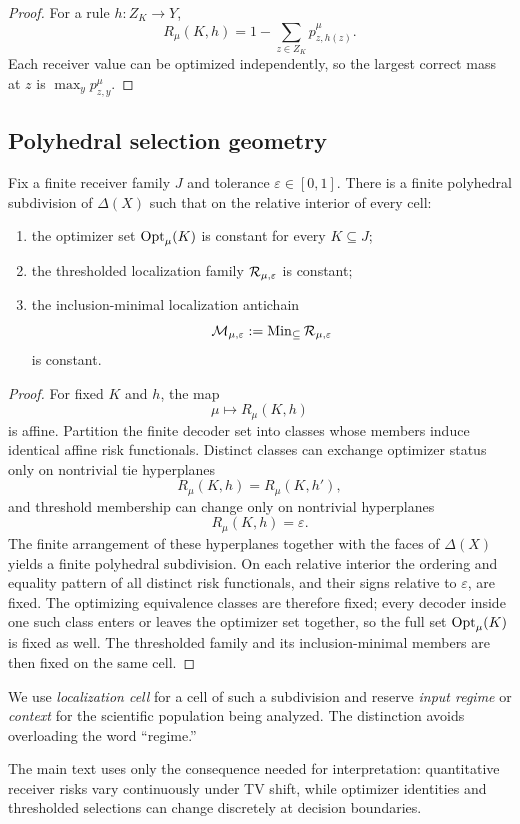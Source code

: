 \begin{proof}
For a rule $h:Z_K\to Y$,
\[
R_\mu(K,h)
=
1-\sum_{z\in Z_K}p_{z,h(z)}^\mu.
\]
Each receiver value can be optimized independently, so the largest correct mass at $z$ is $\max_y p_{z,y}^\mu$.
\end{proof}

\subsection{Polyhedral selection geometry}

\begin{proposition}
\label{thm:app-polyhedral-localization-cells}
Fix a finite receiver family $J$ and tolerance $\varepsilon\in[0,1]$. There is a finite polyhedral subdivision of $\Delta(X)$ such that on the relative interior of every cell:
\begin{enumerate}[label=(\roman*)]
\item the optimizer set $\operatorname{Opt}_\mu(K)$ is constant for every $K\subseteq J$;
\item the thresholded localization family $\mathcal{R}_{\mu,\varepsilon}$ is constant;
\item the inclusion-minimal localization antichain
\[
\mathcal{M}_{\mu,\varepsilon}:=\operatorname{Min}_{\subseteq}\mathcal{R}_{\mu,\varepsilon}
\]
is constant.
\end{enumerate}
\end{proposition}

\begin{proof}
For fixed $K$ and $h$, the map
\[
\mu\longmapsto R_\mu(K,h)
\]
is affine. Partition the finite decoder set into classes whose members induce identical affine risk functionals. Distinct classes can exchange optimizer status only on nontrivial tie hyperplanes
\[
R_\mu(K,h)=R_\mu(K,h'),
\]
and threshold membership can change only on nontrivial hyperplanes
\[
R_\mu(K,h)=\varepsilon.
\]
The finite arrangement of these hyperplanes together with the faces of $\Delta(X)$ yields a finite polyhedral subdivision. On each relative interior the ordering and equality pattern of all distinct risk functionals, and their signs relative to $\varepsilon$, are fixed. The optimizing equivalence classes are therefore fixed; every decoder inside one such class enters or leaves the optimizer set together, so the full set $\operatorname{Opt}_\mu(K)$ is fixed as well. The thresholded family and its inclusion-minimal members are then fixed on the same cell.
\end{proof}

We use \emph{localization cell} for a cell of such a subdivision and reserve \emph{input regime} or \emph{context} for the scientific population being analyzed. The distinction avoids overloading the word ``regime.''

The main text uses only the consequence needed for interpretation: quantitative receiver risks vary continuously under TV shift, while optimizer identities and thresholded selections can change discretely at decision boundaries.
